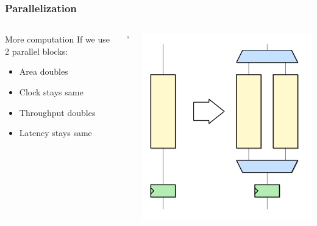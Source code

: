 \documentclass[compress]{beamer}
\begin{document}
\begin{frame}
	\frametitle{Parallelization}
	\begin{columns}
		
		\begin{block}{More computation}
			If we use 2 parallel blocks:
			\begin{itemize}
				\item Area doubles
				\item Clock stays same
				\item Throughput doubles
				\item Latency stays same
			\end{itemize}
		\end{block}'
		\begin{center}
			\includegraphics[width=0.7 \textwidth]{parallel}
		\end{center}	
	\end{columns}
\end{frame}
\end{document}
